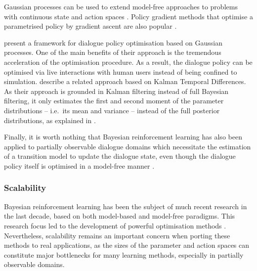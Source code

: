 Gaussian processes can be used to extend model-free approaches to problems with continuous state and action spaces \citep{Engel:2005}. Policy gradient methods that optimise a parametrised policy by gradient ascent are also popular \citep{GhavamzadehE06}. 



\cite{milica2013} present a framework for dialogue policy optimisation based on Gaussian processes. One of the main benefits of their approach is the tremendous acceleration of the optimisation procedure.  As a result, the dialogue policy can be optimised via live interactions with human users instead of being confined to simulation. \cite{Supelec808} describe a related approach based on Kalman Temporal Differences.  As their approach is grounded in Kalman filtering instead of full Bayesian filtering, it only estimates the first and second moment of the parameter distributions -- i.e.\ its mean and variance -- instead of the full posterior distributions, as explained in \cite{DBLP:journals/jair/GeistP10}. 

Finally, it is worth nothing that Bayesian reinforcement learning has also been applied to partially observable dialogue domains which necessitate the estimation of a transition model to update the dialogue state, even though the dialogue policy itself is optimised in a model-free manner \citep{DBLP:conf/slt/ThomsonJGKMYY10}. 


\subsubsection*{Scalability}

Bayesian reinforcement learning has been the subject of much recent research in the last decade, based on both model-based and model-free paradigms. This research focus led to the development of powerful optimisation methods \cite[see e.g.][for a detailed survey]{brl2012}. Nevertheless, scalability remains an important concern when porting these methods to real applications, as the sizes of the parameter and action spaces can  constitute major bottlenecks for many learning methods, especially in partially observable domains. 

